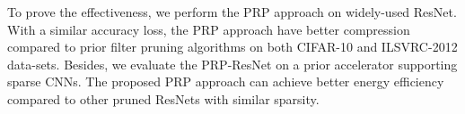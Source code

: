\documentclass[journal,article,submit,pdftex,moreauthors]{Definitions/mdpi}
\begin{document}
To prove the effectiveness, we perform the PRP approach on widely-used ResNet. With a similar accuracy loss, the PRP approach have better compression compared to prior filter pruning algorithms on both CIFAR-10 and ILSVRC-2012 data-sets. Besides, we evaluate the PRP-ResNet on a prior accelerator supporting sparse CNNs. The proposed PRP approach can achieve better energy efficiency compared to other pruned ResNets with similar sparsity.








\end{document}
